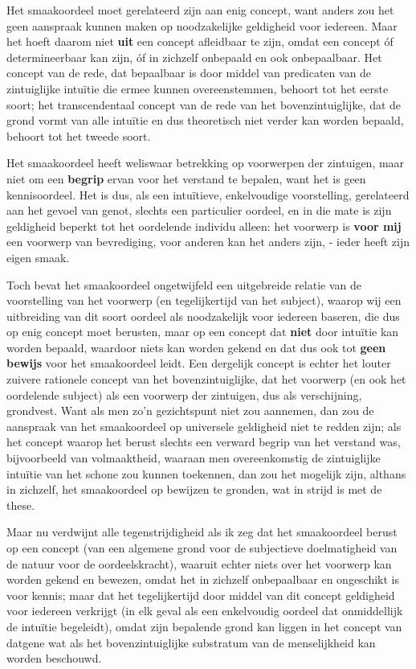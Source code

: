 Het smaakoordeel moet gerelateerd zijn aan enig concept, want anders zou het geen aanspraak kunnen maken op noodzakelijke geldigheid voor iedereen. Maar het hoeft daarom niet \textbf{uit} een concept afleidbaar te zijn, omdat een concept óf determineerbaar kan zijn, óf in zichzelf onbepaald en ook onbepaalbaar. Het concept van de rede, dat bepaalbaar is door middel van predicaten van de zintuiglijke intuïtie die ermee kunnen overeenstemmen, behoort tot het eerste soort; het transcendentaal concept van de rede van het bovenzintuiglijke, dat de grond vormt van alle intuïtie en dus theoretisch niet verder kan worden bepaald, behoort tot het tweede soort.

Het smaakoordeel heeft weliswaar betrekking op voorwerpen der zintuigen, maar niet om een \textbf{begrip} ervan voor het verstand te bepalen, want het is geen kennisoordeel. Het is dus, als een intuïtieve, enkelvoudige voorstelling, gerelateerd aan het gevoel van genot, slechts een particulier oordeel, en in die mate is zijn geldigheid beperkt tot het oordelende individu alleen: het voorwerp is \textbf{voor mij} een voorwerp van bevrediging, voor anderen kan het anders zijn, - ieder heeft zijn eigen smaak.

Toch bevat het smaakoordeel ongetwijfeld een uitgebreide relatie van de voorstelling van het voorwerp (en tegelijkertijd van het subject), waarop wij een uitbreiding van dit soort oordeel als noodzakelijk voor iedereen baseren, die dus op enig concept moet berusten, maar op een concept dat \textbf{niet} door intuïtie kan worden bepaald, waardoor niets kan worden gekend en dat dus ook tot \textbf{geen bewijs} voor het smaakoordeel leidt. Een dergelijk concept is echter het louter zuivere rationele concept van het bovenzintuiglijke, dat het voorwerp (en ook het oordelende subject) als een voorwerp der zintuigen, dus als verschijning, grondvest. Want als men zo'n gezichtspunt niet zou aannemen, dan zou de aanspraak van het smaakoordeel op universele geldigheid niet te redden zijn; als het concept waarop het berust slechts een verward begrip van het verstand was, bijvoorbeeld van volmaaktheid, waaraan men overeenkomstig de zintuiglijke intuïtie van het schone zou kunnen toekennen, dan zou het mogelijk zijn, althans in zichzelf, het smaakoordeel op bewijzen te gronden, wat in strijd is met de these.

Maar nu verdwijnt alle tegenstrijdigheid als ik zeg dat het smaakoordeel berust op een concept (van een algemene grond voor de subjectieve doelmatigheid van de natuur voor de oordeelskracht), waaruit echter niets over het voorwerp kan worden gekend en bewezen, omdat het in zichzelf onbepaalbaar en ongeschikt is voor kennis; maar dat het tegelijkertijd door middel van dit concept geldigheid voor iedereen verkrijgt (in elk geval als een enkelvoudig oordeel dat onmiddellijk de intuïtie begeleidt), omdat zijn bepalende grond kan liggen in het concept van datgene wat als het bovenzintuiglijke substratum van de menselijkheid kan worden beschouwd.

